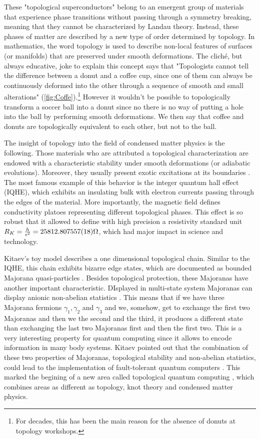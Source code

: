 These "topological superconductors" belong to an emergent group of materials that experience phase transitions without passing through a symmetry breaking, meaning that they cannot be characterized by Landau theory. Instead, these phases of matter are described by  a new type of  order determined by topology. In mathematics, the word topology is used to describe non-local features of surfaces (or manifolds) that are preserved under smooth deformations. The clich\'e, but always educative, joke to explain this concept says that "Topologists cannot tell the difference between a donut and a coffee cup, since one of them 
can always be continuously deformed into the other through a
sequence of smooth and small alterations" (\ref{fig:Coffe}).\footnote{For decades, this has been the main reason for the absence of donuts at topology workshops.} However it wouldn't be possible to topologically transform a soccer ball into  a donut since no there is no way of putting  a hole into the ball by performing smooth deformations. We then say that coffee and donuts are topologically equivalent to each other, but not to the ball. 



The insight of topology into  the field of condensed matter physics is the following. Those materials who are attributed a topological characterization are endowed with a characteristic stability under smooth deformations (or adiabatic evolutions). Moreover, they usually present exotic excitations at its boundaries . The most famous example of this behavior is the integer quantum hall effect (IQHE), which exhibits an insulating bulk with electron currents passing through the edges of the material. More importantly, the magnetic field defines conductivity platoes representing different topological phases. This effect is so robust that it allowed to define with high precision a resistivity standard unit $ R_K =\frac{h}{\epsilon^2} = 25812.807557(18) \Omega$, which had major impact in science and technology. 


Kitaev's toy model describes a one dimensional  topological chain. Similar to the IQHE, this chain exhibits bizarre edge states, which are documented as bounded Majorana quasi-particles . Besides topological protection, these Majoranas have another important characteristic. DIsplayed in multi-state system Majoranas can display anionic non-abelian statistics \citep{kitaev_fault-tolerant_2003}. This means that if we have three Majorana fermions $\gamma_1 ,\gamma_2 $ and $\gamma_3$ and we, somehow, get to exchange the first two Majoranas and then we  the second and the third, it produces a different state than exchanging the last two Majoranas first and then the first two. This is a very interesting property for quantum computing since it allows to encode information in many body systems.  Kitaev pointed out that the combination of these two properties of Majoranas, topological stability and non-abelian statistics, could lead  to the implementation of fault-tolerant quantum computers . This marked the begining of a new area called  topological quantum computing \cite{pachos_introduction_2012}, which combines areas as different as topology, knot theory \cite{turaev_book} and condensed matter physics. 

